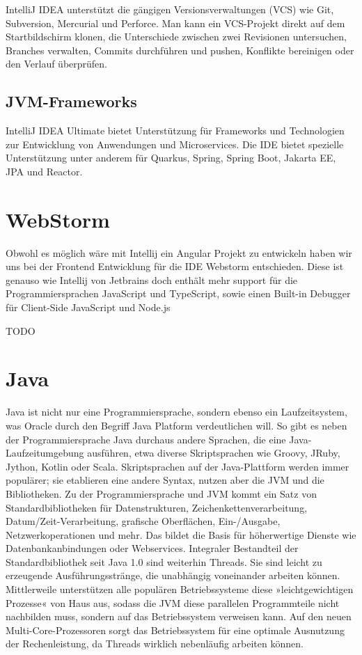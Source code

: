 IntelliJ IDEA unterstützt die gängigen Versionsverwaltungen (VCS) wie Git, Subversion, Mercurial und Perforce. 
Man kann ein VCS-Projekt direkt auf dem Startbildschirm klonen, die Unterschiede zwischen zwei Revisionen untersuchen, Branches verwalten, 
Commits durchführen und pushen, Konflikte bereinigen oder den Verlauf überprüfen. 
\cite{sysarch-intellij-1}


\subsection{JVM-Frameworks}

IntelliJ IDEA Ultimate bietet Unterstützung für Frameworks und Technologien zur Entwicklung von Anwendungen und Microservices. 
Die IDE bietet spezielle Unterstützung unter anderem für Quarkus, Spring, Spring Boot, Jakarta EE, JPA und Reactor.
\cite{sysarch-intellij-1}


\section{WebStorm}


Obwohl es möglich wäre mit Intellij ein Angular Projekt zu entwickeln haben wir uns bei der Frontend Entwicklung 
für die IDE Webstorm entschieden. Diese ist genauso wie Intellij von Jetbrains doch enthält mehr support für die 
Programmiersprachen JavaScript und TypeScript, sowie einen Built-in Debugger für Client-Side JavaScript und Node.js 

TODO


\section{Java}

Java ist nicht nur eine Programmiersprache, sondern ebenso ein Laufzeitsystem, was Oracle durch den Begriff Java Platform verdeutlichen will. 
So gibt es neben der Programmiersprache Java durchaus andere Sprachen, die eine Java-Laufzeitumgebung ausführen, etwa diverse Skriptsprachen wie 
Groovy, JRuby, Jython, Kotlin oder Scala. Skriptsprachen auf der Java-Plattform werden immer populärer; sie etablieren eine andere Syntax, nutzen aber die JVM und die Bibliotheken.
Zu der Programmiersprache und JVM kommt ein Satz von Standardbibliotheken für Datenstrukturen, Zeichenkettenverarbeitung, Datum/Zeit-Verarbeitung, grafische Oberflächen, 
Ein-/Ausgabe, Netzwerkoperationen und mehr. Das bildet die Basis für höherwertige Dienste wie Datenbankanbindungen oder Webservices. Integraler Bestandteil der Standardbibliothek 
seit Java 1.0 sind weiterhin Threads. Sie sind leicht zu erzeugende Ausführungsstränge, die unabhängig voneinander arbeiten können. 
Mittlerweile unterstützen alle populären Betriebssysteme diese »leichtgewichtigen Prozesse« von Haus aus, sodass die JVM diese parallelen Programmteile nicht nachbilden muss, 
sondern auf das Betriebssystem verweisen kann. Auf den neuen Multi-Core-Prozessoren sorgt das Betriebssystem für eine optimale Ausnutzung der Rechenleistung, da Threads wirklich nebenläufig arbeiten können.
\cite{sysarch-java-1}

